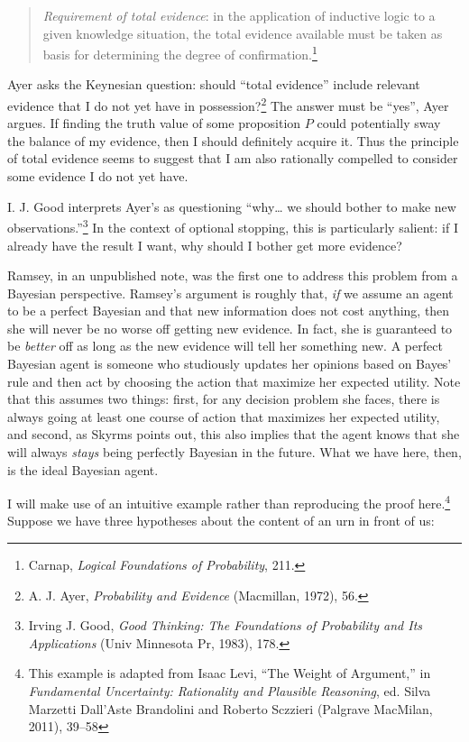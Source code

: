 \begin{quote}
\emph{Requirement of total evidence}: in the application of inductive
logic to a given knowledge situation, the total evidence available must
be taken as basis for determining the degree of confirmation.\footnote{Carnap,
  \emph{Logical Foundations of Probability}, 211.}
\end{quote}

Ayer asks the Keynesian question: should ``total evidence'' include
relevant evidence that I do not yet have in possession?\footnote{A. J.
  Ayer, \emph{Probability and Evidence} (Macmillan, 1972), 56.} The
answer must be ``yes'', Ayer argues. If finding the truth value of some
proposition \(P\) could potentially sway the balance of my evidence,
then I should definitely acquire it. Thus the principle of total
evidence seems to suggest that I am also rationally compelled to
consider some evidence I do not yet have.

I. J. Good interprets Ayer's as questioning ``why\ldots{} we should
bother to make new observations.''\footnote{Irving J. Good, \emph{Good
  Thinking: The Foundations of Probability and Its Applications} (Univ
  Minnesota Pr, 1983), 178.} In the context of optional stopping, this
is particularly salient: if I already have the result I want, why should
I bother get more evidence?

Ramsey, in an unpublished note, was the first one to address this
problem from a Bayesian perspective. Ramsey's argument is roughly that,
\emph{if} we assume an agent to be a perfect Bayesian and that new
information does not cost anything, then she will never be no worse off
getting new evidence. In fact, she is guaranteed to be \emph{better} off
as long as the new evidence will tell her something new. A perfect
Bayesian agent is someone who studiously updates her opinions based on
Bayes' rule and then act by choosing the action that maximize her
expected utility. Note that this assumes two things: first, for any
decision problem she faces, there is always going at least one course of
action that maximizes her expected utility, and second, as Skyrms points
out, this also implies that the agent knows that she will always
\emph{stays} being perfectly Bayesian in the future. What we have here,
then, is the ideal Bayesian agent.

I will make use of an intuitive example rather than reproducing the
proof here.\footnote{This example is adapted from Isaac Levi, ``The
  Weight of Argument,'' in \emph{Fundamental Uncertainty: Rationality
  and Plausible Reasoning}, ed. Silva Marzetti Dall'Aste Brandolini and
  Roberto Sczzieri (Palgrave MacMilan, 2011), 39--58} Suppose we have
three hypotheses about the content of an urn in front of us:

